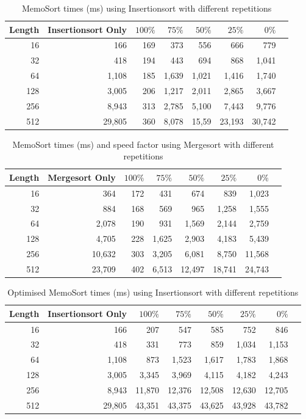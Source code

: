 \documentclass[a4paper,12pt]{article}
\begin{document}
\begin{table}[H]
\centering
\begin{tabular}{|r|r|r|r|r|r|r|r|}   \hline
	{Length} & {Insertionsort Only} & {$100\%$} & {$75\%$} & {$50\%$} & {$25\%$} & {$0\%$} \\  \hline
	16 &166 &169&373& 556& 666& 779\\ 
	32 &418 &194&443& 694& 868& 1,041\\ 
	64 &1,108&185 &1,639&1,021&1,416 & 1,740\\ 
	128 &3,005 &206&1,217&2,011&2,865 &3,667\\ 
	256 &8,943 &313&2,785&5,100&7,443&9,776\\ 
	512 &29,805& 360&8,078&15,59 &23,193 &30,742\\  \hline
\end{tabular}
\caption{MemoSort times (ms) using Insertionsort with different repetitions}
\end{table}

\begin{table}[H]
\centering
\begin{tabular}{|r|r|r|r|r|r|r|r|}   \hline
	{Length} & {Mergesort Only} & {$100\%$} & {$75\%$} & {$50\%$} & {$25\%$} & {$0\%$} \\  \hline
	16 &364&172&431 & 674 & 839 & 1,023\\ 
	32 &884&168&569 & 965& 1,258& 1,555\\ 
	64 &2,078&190 &931&1,569&2,144&2,759\\ 
	128 &4,705&228&1,625&2,903&4,183&5,439\\ 
	256 &10,632&303&3,205&6,081&8,750&11,568\\ 
	512 &23,709& 402&6,513&12,497&18,741&24,743\\  \hline
\end{tabular}
\caption{MemoSort times (ms) and speed factor using Mergesort with different repetitions}
\end{table}


\begin{table}[H]
\centering
\begin{tabular}{|r|r|r|r|r|r|r|r|}   \hline
	{Length} & {Insertionsort Only} & {$100\%$} & {$75\%$} & {$50\%$} & {$25\%$} & {$0\%$} \\  \hline
	16 &166&207&547 & 585 & 752 & 846\\ 
	32 &418&331&773 & 859& 1,034& 1,153\\ 
	64 &1,108&873 &1,523&1,617&1,783& 1,868\\ 
	128 &3,005&3,345&3,969&4,115&4,182 &4,243\\ 
	256 &8,943&11,870&12,376 &12,508&12,630&12,705\\ 
	512 &29,805 & 43,351&43,375 &43,625 &43,928 &43,782\\  \hline
\end{tabular}
\caption{Optimised MemoSort times (ms) using Insertionsort with different repetitions}
\end{table}
\end{document}
